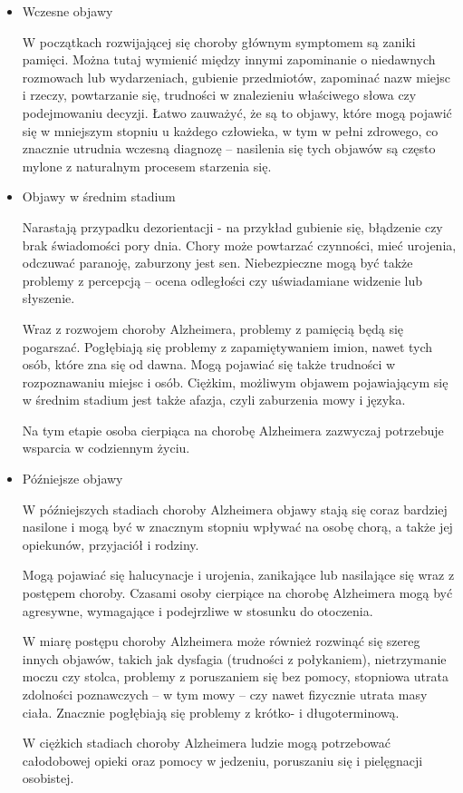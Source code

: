 \begin{itemize}

  \item Wczesne objawy

        W początkach rozwijającej się choroby głównym symptomem są zaniki pamięci.
        Można tutaj wymienić między innymi zapominanie o niedawnych rozmowach lub wydarzeniach, gubienie przedmiotów, zapominać nazw miejsc i rzeczy, powtarzanie się, trudności w znalezieniu właściwego słowa czy podejmowaniu decyzji.
        Łatwo zauważyć, że są to objawy, które mogą pojawić się w mniejszym stopniu u każdego człowieka, w tym w pełni zdrowego, co znacznie utrudnia wczesną diagnozę -- nasilenia się tych objawów są często mylone z naturalnym procesem starzenia się.

  \item Objawy w średnim stadium

        Narastają przypadku dezorientacji - na przykład gubienie się, błądzenie czy brak świadomości pory dnia.
        Chory może powtarzać czynności, mieć urojenia, odczuwać paranoję, zaburzony jest sen.
        Niebezpieczne mogą być także problemy z percepcją -- ocena odległości czy uświadamiane widzenie lub słyszenie.

        Wraz z rozwojem choroby Alzheimera, problemy z pamięcią będą się pogarszać.
        Pogłębiają się problemy z zapamiętywaniem imion, nawet tych osób, które zna się od dawna.
        Mogą pojawiać się także trudności w rozpoznawaniu miejsc i osób.
        Ciężkim, możliwym objawem pojawiającym się w średnim stadium jest także afazja, czyli zaburzenia mowy i języka.

        Na tym etapie osoba cierpiąca na chorobę Alzheimera zazwyczaj potrzebuje wsparcia w codziennym życiu.

  \item Późniejsze objawy

        W późniejszych stadiach choroby Alzheimera objawy stają się coraz bardziej nasilone i mogą być w znacznym stopniu wpływać na osobę chorą, a także jej opiekunów, przyjaciół i rodziny.

        Mogą pojawiać się halucynacje i urojenia, zanikające lub nasilające się wraz z postępem choroby.
        Czasami osoby cierpiące na chorobę Alzheimera mogą być agresywne, wymagające i podejrzliwe w stosunku do otoczenia.

        W miarę postępu choroby Alzheimera może również rozwinąć się szereg innych objawów, takich jak dysfagia (trudności z połykaniem), nietrzymanie moczu czy stolca, problemy z poruszaniem się bez pomocy, stopniowa utrata zdolności poznawczych -- w tym mowy -- czy nawet fizycznie utrata masy ciała.
        Znacznie pogłębiają się problemy z krótko- i długoterminową.

        W ciężkich stadiach choroby Alzheimera ludzie mogą potrzebować całodobowej opieki oraz pomocy w jedzeniu, poruszaniu się i pielęgnacji osobistej.

\end{itemize}

